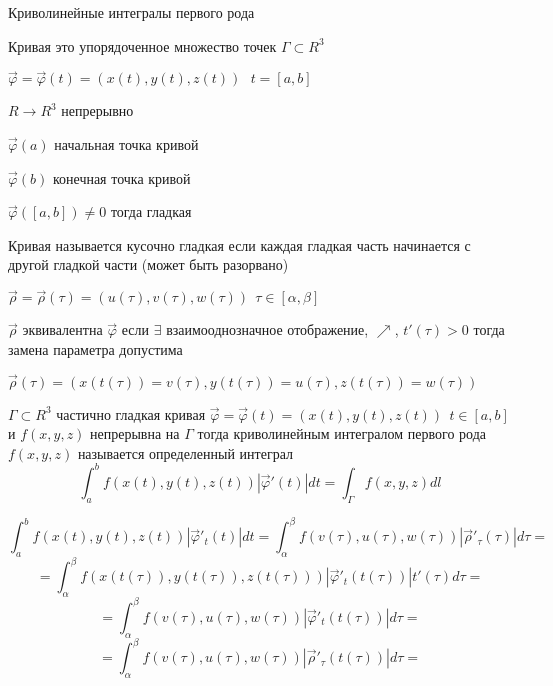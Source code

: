 \begin{title}[\Large]
  Криволинейные интегралы первого рода
\end{title}

\begin{block}[Кривая]
  Кривая это упорядоченное множество точек $\Gamma \subset R^3$

  $\vec \varphi = \vec \varphi(t) = (x(t), y(t), z(t)) ~~~ t = [a,b]$

  $R \to R^3$ непрерывно

  $\vec \varphi(a)$ начальная точка кривой

  $\vec \varphi(b)$ конечная точка кривой

  $\vec \varphi([a,b]) \not= 0$ тогда гладкая

  Кривая называется кусочно гладкая если каждая гладкая часть начинается с
  другой гладкой части (может быть разорвано)

  $\vec \rho = \vec \rho(\tau) = (u(\tau), v(\tau), w(\tau)) ~~
  \tau \in [\alpha, \beta]$

  $\vec \rho$ эквивалентна $\vec \varphi$ если $\exists$ взаимооднозначное
  отображение, $\nearrow$, $t'(\tau) > 0$ тогда замена параметра допустима

  $\vec \rho(\tau) = (x(t(\tau)) = v(\tau), y(t(\tau)) = u(\tau),
  z(t(\tau)) = w(\tau))$
\end{block}

\begin{define}
  $\Gamma \subset R^3$ частично гладкая кривая $\vec \varphi = \vec \varphi(t) =
  (x(t), y(t), z(t)) ~~ t \in [a,b]$ и $f(x,y,z)$ непрерывна на $\Gamma$ тогда
  криволинейным интегралом первого рода $f(x,y,z)$ называется определенный
  интеграл
  $$
  \int_a^b f(x(t), y(t), z(t))|\vec \varphi'(t)|dt =
  \int_{\Gamma} f(x,y,z) d l
  $$
\end{define}

\begin{theorem}
  $$
  \int_a^b f(x(t), y(t), z(t))|\vec \varphi'_t(t)|dt =
  \int_{\alpha}^{\beta} f(v(\tau), u(\tau), w(\tau))
  |\vec \rho'_{\tau}(\tau)|d\tau =
  $$
  $$
  = \int_{\alpha}^{\beta} f(x(t(\tau)), y(t(\tau)), z(t(\tau)))
  |\vec \varphi'_t(t(\tau))| t'(\tau)d\tau =
  $$
  $$
  = \int_{\alpha}^{\beta} f(v(\tau), u(\tau), w(\tau))
  |\vec \varphi'_t(t(\tau))| d\tau =
  $$
  $$
  = \int_{\alpha}^{\beta} f(v(\tau), u(\tau), w(\tau))
  |\vec \rho'_{\tau}(t(\tau))| d\tau =
  $$
\end{theorem}

